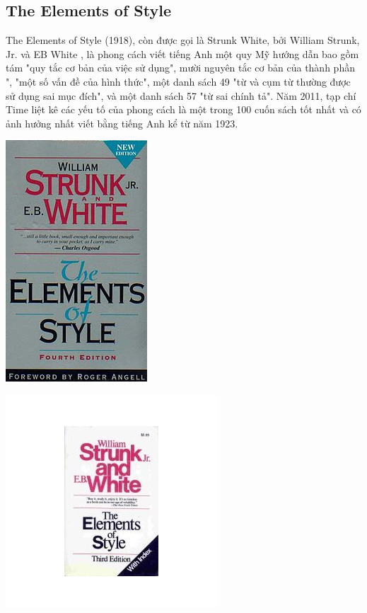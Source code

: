 \documentclass{hcmutarticle}
\begin{document}
\subsection{The Elements of Style}
The Elements of Style (1918), còn được gọi là Strunk  White, bởi William Strunk, Jr. và EB White , là phong cách viết tiếng Anh một quy Mỹ hướng dẫn bao gồm tám "quy tắc cơ bản của việc sử dụng", mười nguyên tắc cơ bản của thành phần ", "một số vấn đề của hình thức", một danh sách 49 "từ và cụm từ thường được sử dụng sai mục đích", và một danh sách 57 "từ sai chính tả".
Năm 2011, tạp chí Time liệt kê các yếu tố của phong cách là một trong 100 cuốn sách tốt nhất và có ảnh hưởng nhất viết bằng tiếng Anh kể từ năm 1923.
\begin{flushleft}
\includegraphics[scale=1]{hinh2}\\[1cm]
\end{flushleft}
\begin{flushleft}
\includegraphics[scale=1]{hinh3}\\[1cm]
\end{flushleft}
\end{document}
